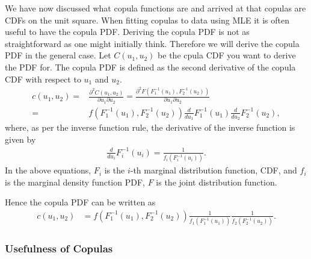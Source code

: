 We have now discussed what copula functions are and arrived at that copulas are \gls{CDF}s on the unit square. When fitting copulas to data using \gls{MLE} it is often useful to have the copula \gls{PDF}. Deriving the copula \gls{PDF} is not as straightforward as one might initially think. Therefore we will derive the copula \gls{PDF} in the general case. Let $C(u_1,u_2)$ be the cpula \gls{CDF} you want to derive the \gls{PDF} for. The copula \gls{PDF} is defined as the second derivative of the copula \gls{CDF} with respect to $u_1$ and $u_2$.
\begin{align*}
    c(u_1,u_2) =& \frac{\partial^2C(u_1,u_2)}{\partial u_1\partial u_2} = 
    \frac{\partial^2F(F_1^{-1}(u_1),F_2^{-1}(u_2))}{\partial u_1\partial u_2}\\
    =&  f(F_1^{-1}(u_1),F_2^{-1}(u_2)) \frac{d}{du_1} F_1^{-1}(u_1)  \frac{d}{du_2} F_2^{-1}(u_2),
\end{align*}
where, as per the inverse function rule, the derivative of the inverse function is given by
\begin{align*}
    \frac{d}{du_i} F_i^{-1}(u_i) = \frac{1}{f_i(F_i^{-1}(u_i))}.
\end{align*}
In the above equations, $F_i$ is the $i$-th marginal distribution function, \gls{CDF}, and $f_i$ is the marginal density function \gls{PDF}, $F$ is the joint distribution function.   

Hence the copula \gls{PDF} can be written as 
\begin{align*}
    c(u_1,u_2) &= f(F_1^{-1}(u_1),F_2^{-1}(u_2)) \frac{1}{f_1(F_1^{-1}(u_1))}\frac{1}{f_2(F_2^{-1}(u_2))}. 
\end{align*}




\subsubsection{Usefulness of Copulas}\label{sec:NeedForCopulas}


